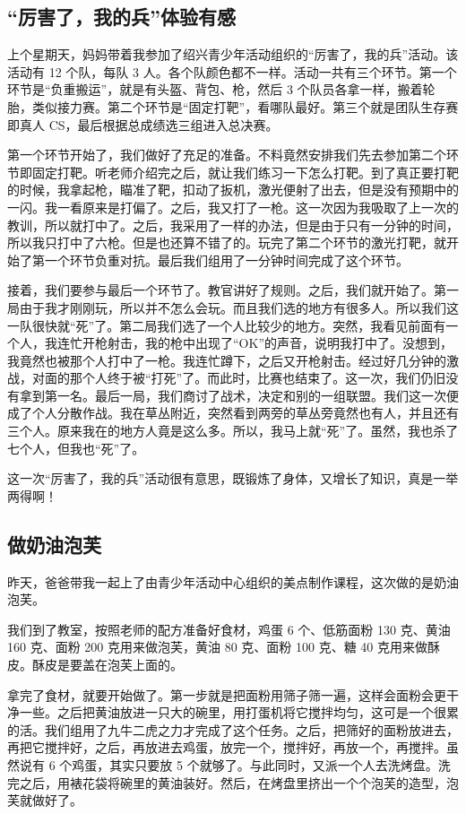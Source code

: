 \documentclass[UTF8,a4paper,titlepage,twoside,10.5pt]{article}
\begin{document}
\subsection{“厉害了，我的兵”体验有感}
\label{sec:org2740540}

上个星期天，妈妈带着我参加了绍兴青少年活动组织的“厉害了，我的兵”活动。该活动有 12 个队，每队 3 人。各个队颜色都不一样。活动一共有三个环节。第一个环节是“负重搬运”，就是有头盔、背包、枪，然后 3 个队员各拿一样，搬着轮胎，类似接力赛。第二个环节是“固定打靶”，看哪队最好。第三个就是团队生存赛即真人 CS，最后根据总成绩选三组进入总决赛。

第一个环节开始了，我们做好了充足的准备。不料竟然安排我们先去参加第二个环节即固定打靶。听老师介绍完之后，就让我们练习一下怎么打靶。到了真正要打靶的时候，我拿起枪，瞄准了靶，扣动了扳机，激光便射了出去，但是没有预期中的一闪。我一看原来是打偏了。之后，我又打了一枪。这一次因为我吸取了上一次的教训，所以就打中了。之后，我采用了一样的办法，但是由于只有一分钟的时间，所以我只打中了六枪。但是也还算不错了的。玩完了第二个环节的激光打靶，就开始了第一个环节负重对抗。最后我们组用了一分钟时间完成了这个环节。

接着，我们要参与最后一个环节了。教官讲好了规则。之后，我们就开始了。第一局由于我才刚刚玩，所以并不怎么会玩。而且我们选的地方有很多人。所以我们这一队很快就“死”了。第二局我们选了一个人比较少的地方。突然，我看见前面有一个人，我连忙开枪射击，我的枪中出现了“OK”的声音，说明我打中了。没想到，我竟然也被那个人打中了一枪。我连忙蹲下，之后又开枪射击。经过好几分钟的激战，对面的那个人终于被“打死”了。而此时，比赛也结束了。这一次，我们仍旧没有拿到第一名。最后一局，我们商讨了战术，决定和别的一组联盟。我们这一次便成了个人分散作战。我在草丛附近，突然看到两旁的草丛旁竟然也有人，并且还有三个人。原来我在的地方人竟是这么多。所以，我马上就“死”了。虽然，我也杀了七个人，但我也“死”了。

这一次“厉害了，我的兵”活动很有意思，既锻炼了身体，又增长了知识，真是一举两得啊！

\subsection{做奶油泡芙}
\label{sec:org4d9b8e8}

昨天，爸爸带我一起上了由青少年活动中心组织的美点制作课程，这次做的是奶油泡芙。

我们到了教室，按照老师的配方准备好食材，鸡蛋 6 个、低筋面粉 130 克、黄油 160 克、面粉 200 克用来做泡芙，黄油 80 克、面粉 100 克、糖 40 克用来做酥皮。酥皮是要盖在泡芙上面的。

拿完了食材，就要开始做了。第一步就是把面粉用筛子筛一遍，这样会面粉会更干净一些。之后把黄油放进一只大的碗里，用打蛋机将它搅拌均匀，这可是一个很累的活。我们组用了九牛二虎之力才完成了这个任务。之后，把筛好的面粉放进去，再把它搅拌好，之后，再放进去鸡蛋，放完一个，搅拌好，再放一个，再搅拌。虽然说有 6 个鸡蛋，其实只要放 5 个就够了。与此同时，又派一个人去洗烤盘。洗完之后，用裱花袋将碗里的黄油装好。然后，在烤盘里挤出一个个泡芙的造型，泡芙就做好了。
\end{document}
